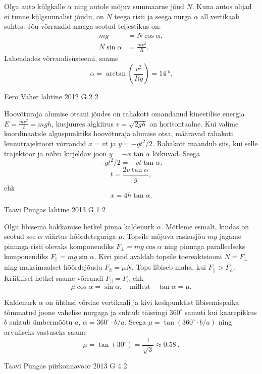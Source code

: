 \documentclass[11pt]{article}
\begin{document}
{{\ifSolution
Olgu auto külgkalle $\alpha$ ning autole mõjuv summaarne jõud $N$. Kuna autos olijad ei tunne külgsuunalist jõudu, on $N$ teega risti ja seega nurga $\alpha$ all vertikaali suhtes. Jõu võrrandid maaga seotud teljestikus on:
\begin{align*}
mg &= N\cos \alpha,\\
N\sin\alpha &= \frac{mv^2}{R}.
\end{align*}
Lahendades võrrandisüsteemi, saame
\[
\alpha = \arctan\left(\frac{v^2}{Rg}\right) = \SI{14}{\degree}.
\]
\fi
}

{Eero Vaher} %
{lahtine} %
{2012} %
{G 2} %
{2} %
{

\ifSolution
Hoovõturaja alumise otsani jõudes on rahakott omandanud kineetilise energia $E=\frac{mv^2}{2}=mgh$, kusjuures algkiirus $v=\sqrt{2gh}$ on horisontaalne. Kui valime koordinaatide alguspunktiks hoovõturaja alumise otsa, määravad rahakoti lennutrajektoori võrrandid $x=vt$ ja $y=-gt^2 / 2$. Rahakott maandub siis, kui selle trajektoor ja nõlva kirjeldav joon $y=-x\tan\alpha$ lõikuvad. Seega 
$$-gt^2 / 2=-vt\tan\alpha,$$ 
$$t=\frac{2v \tan \alpha}{g},$$ 
ehk
$$x=4h \tan\alpha.$$
\fi
}

{Taavi Pungas} %
{lahtine} %
{2013} %
{G 1} %
{2} %
{

\ifSolution
Olgu libisema hakkamise hetkel pinna kaldenurk $\alpha$. Mõtleme esmalt, kuidas on seotud see $\alpha$ väärtus hõõrdeteguriga $\mu$. Topsile mõjuva raskusjõu $mg$ jagame pinnaga risti olevaks komponendiks $F_{\bot}=mg\cos\alpha$ ning pinnaga paralleelseks komponendiks $F_{||}=mg\sin\alpha$. Kivi pind avaldab topsile toereaktsiooni $N=F_\bot$ ning maksimaalset hõõrdejõudu $F_h=\mu N$. Tops libiseb maha, kui $F_{||}>F_h$. Kriitilisel hetkel saame võrrandi $F_{||}=F_h$ ehk
\[ \mu \cos \alpha = \sin\alpha, \quad \text{millest} \quad \tan\alpha = \mu.\]

Kaldenurk $\alpha$ on ühtlasi võrdne vertikaali ja kivi keskpunktist libisemispaika tõmmatud joone vahelise nurgaga ja suhtub täisringi $360^\circ$ samuti kui kaarepikkus $b$ suhtub ümbermõõtu $a$, $\alpha = 360^\circ \!\cdot\! b/a$. Seega $\mu = \tan (360^\circ \! \cdot\! b/a)$ ning arvuliseks vastuseks saame 
\[\mu = \tan (30^\circ) = \frac{1}{\sqrt{3}} \approx \SI{0,58}{}.\]
\fi
}

{Taavi Pungas} %
{piirkonnavoor} %
{2013} %
{G 4} %
{2} %
{

}}
\end{document}
